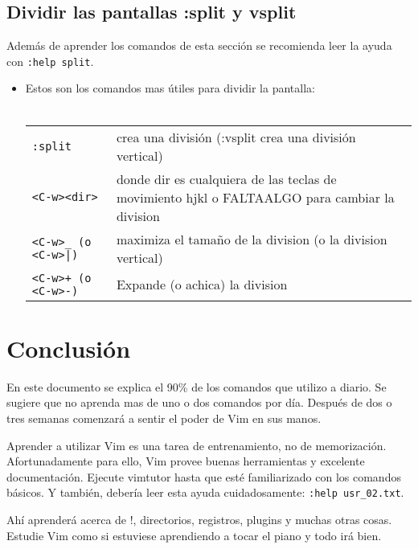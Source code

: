 \documentclass[12pt]{article}
\begin{document}
\subsection{Dividir las pantallas :split y vsplit}

Además de aprender los comandos de esta sección se recomienda leer la ayuda con \texttt{:help split}.

\begin{itemize}
	\item Estos son los comandos mas útiles para dividir la pantalla: \\ \\
\begin{tabular}{ l l }
	\texttt{:split} & crea una división (:vsplit crea una división vertical) \\
	\texttt{<C-w><dir>} & donde dir es cualquiera de las teclas de movimiento hjkl o FALTAALGO para cambiar la division \\
	\texttt{<C-w>\_ (o <C-w>|)} & maximiza el tamaño de la division (o la division vertical) \\
	\texttt{<C-w>+ (o <C-w>-)} & Expande (o achica) la division \\
\end{tabular}
\end{itemize}



\section{Conclusión}

En este documento se explica el 90\% de los comandos que utilizo a diario. Se sugiere que no aprenda mas de uno o dos comandos por día. Después de dos o tres semanas comenzará a sentir el poder de Vim en sus manos.

Aprender a utilizar Vim es una tarea de entrenamiento, no de memorización. Afortunadamente para ello, Vim 
provee buenas herramientas y excelente documentación. Ejecute vimtutor hasta que esté familiarizado con los comandos básicos. Y también, debería leer esta ayuda cuidadosamente:  \texttt{:help usr\_02.txt}.

Ahí aprenderá acerca de !, directorios, registros, plugins y muchas otras cosas. Estudie Vim como si estuviese aprendiendo a tocar el piano y todo irá bien.
\end{document}
